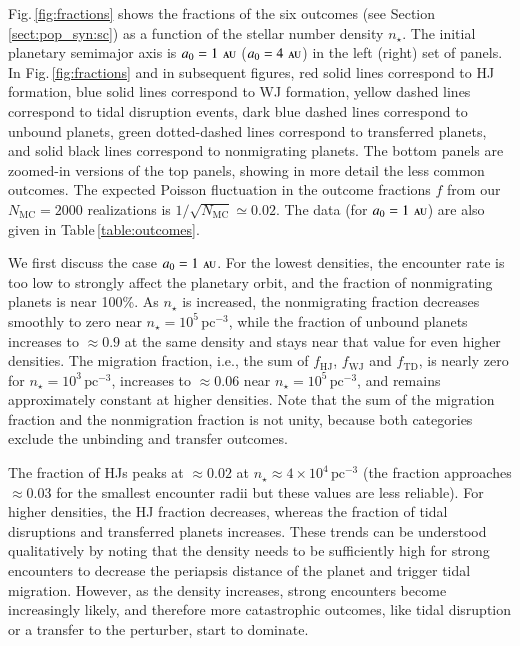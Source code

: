 \documentclass[iop,usenatbib]{emulateapj}
\renewcommand{\S}{Section}
\newcommand{\F}{Fig.}
\newcommand{\au}{\,\textsc{au}}
\begin{document}
\F\,\ref{fig:fractions} shows the fractions of the six outcomes (see \S\,\ref{sect:pop_syn:sc}) as a function of the stellar number density $n_\star$. The initial planetary semimajor axis is $a_0 = 1\,\au$ ($a_0=4\,\au$) in the left (right) set of panels. In \F\,\ref{fig:fractions} and in subsequent figures, red solid lines correspond to HJ formation, blue solid lines correspond to WJ formation, yellow dashed lines correspond to tidal disruption events, dark blue dashed lines correspond to unbound planets, green dotted-dashed lines correspond to transferred planets, and solid black lines correspond to nonmigrating planets. The bottom panels are zoomed-in versions of the top panels, showing in more detail the less common outcomes. The expected Poisson fluctuation in the outcome fractions $f$ from our $N_\mathrm{MC}=2000$ realizations is $1/\sqrt{N_\mathrm{MC}}\simeq 0.02$. The data (for $a_0=1\,\au$) are also given in Table\,\ref{table:outcomes}. 

We first discuss the case $a_0=1\,\au$. For the lowest densities, the encounter rate is too low to strongly affect the planetary orbit, and the fraction of nonmigrating planets is near 100\%. As $n_\star$ is increased, the nonmigrating fraction decreases smoothly to zero near $n_\star= 10^5\, \mathrm{pc^{-3}}$, while the fraction of unbound planets increases to $\approx 0.9$ at the same density and stays near that value for even higher densities. The migration fraction, i.e., the sum of $f_\mathrm{HJ}$, $f_\mathrm{WJ}$ and $f_\mathrm{TD}$, is nearly zero for $n_\star = 10^3\,\mathrm{pc^{-3}}$, increases to $\approx 0.06$ near $n_\star = 10^5\,\mathrm{pc^{-3}}$, and remains approximately constant at higher densities. Note that the sum of the migration fraction and the nonmigration fraction is not unity, because both categories exclude the unbinding and transfer outcomes. 

The fraction of HJs peaks at $\approx 0.02$ at $n_\star\approx 4\times 10^4\,\mathrm{pc^{-3}}$ (the fraction approaches $\approx 0.03$ for the smallest encounter radii but these values are less reliable). For higher densities, the HJ fraction decreases, whereas the fraction of tidal disruptions and transferred planets increases. These trends can be understood qualitatively by noting that the density needs to be sufficiently high for strong encounters to decrease the periapsis distance of the planet and trigger tidal migration. However, as the density increases, strong encounters become increasingly likely, and therefore more catastrophic outcomes, like tidal disruption or a transfer to the perturber, start to dominate. 
\end{document}
